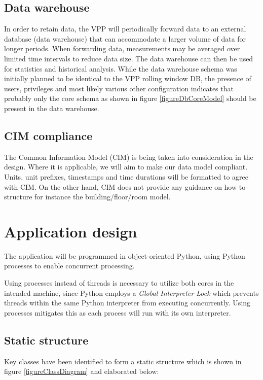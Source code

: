 \subsection{Data warehouse}
In order to retain data, the VPP will periodically forward data to an external database (data warehouse) that can accommodate a larger volume of data for longer periods. When forwarding data, measurements may be averaged over limited time intervals to reduce data size. The data warehouse can then be used for statistics and historical analysis. While the data warehouse schema was initially planned to be identical to the VPP rolling window DB, the presence of users, privileges and most likely various other configuration indicates that probably only the core schema as shown in figure \ref{figureDbCoreModel} should be present in the data warehouse. 

\subsection{CIM compliance}
The Common Information Model (CIM) is being taken into consideration in the design. Where it is applicable, we will aim to make our data model compliant. Units, unit prefixes, timestamps and time durations will be formatted to agree with CIM. On the other hand, CIM does not provide any guidance on how to structure for instance the building/floor/room model.

\newpage
\section{Application design}
The application will be programmed in object-oriented Python, using Python processes to enable concurrent processing. 

Using processes instead of threads is necessary to utilize both cores in the intended machine, since Python employs a \emph{Global Interpreter Lock} which prevents threads within the same Python interpreter from executing concurrently. Using processes mitigates this as each process will run with its own interpreter. 

\subsection{Static structure}
Key classes have been identified to form a static structure which is shown in figure \ref{figureClassDiagram} and elaborated below:

